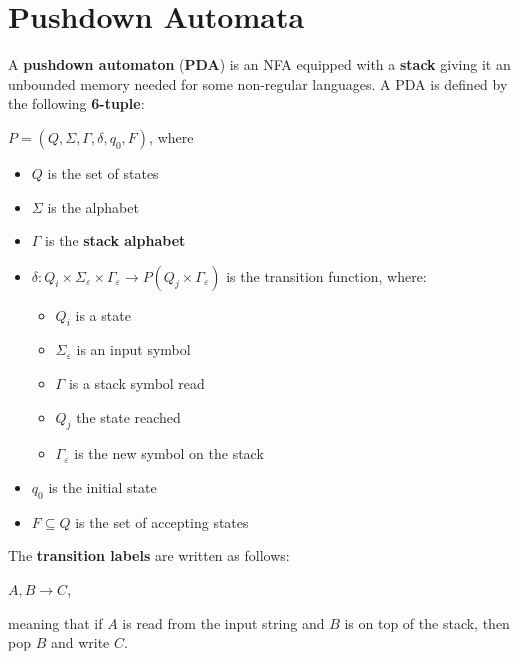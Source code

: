 \documentclass{article}
\begin{document}
\section{Pushdown Automata}
A \textbf{pushdown automaton} (\textbf{PDA}) is an NFA equipped with a \textbf{stack} giving it an unbounded memory needed for some non-regular languages. A PDA is defined by the following \textbf{6-tuple}:
\begin{center}
    $P = (Q, \Sigma, \Gamma, \delta, q_0, F)$, where
\end{center}
\begin{itemize}
    \item $Q$ is the set of states
    \item $\Sigma$ is the alphabet
    \item $\Gamma$ is the \textbf{stack alphabet}
    \item $\delta:Q_i\times\Sigma_\varepsilon\times\Gamma_\varepsilon\rightarrow P(Q_j\times\Gamma_{\varepsilon})$ 
    is the transition function, where:
        \begin{itemize}
            \item $Q_i$ is a state
            \item $\Sigma_\varepsilon$ is an input symbol
            \item $\Gamma$ is a stack symbol read
            \item $Q_j$ the state reached
            \item $\Gamma_\varepsilon$ is the new symbol on the stack 
        \end{itemize}
    \item $q_0$ is the initial state
    \item $F \subseteq Q$ is the set of accepting states
\end{itemize}
The \textbf{transition labels} are written as follows:
\begin{center}
    $A,B \rightarrow C$,
\end{center}
meaning that if $A$ is read from the input string and $B$ is on top of the stack, then pop $B$ and write $C$.
\end{document}
